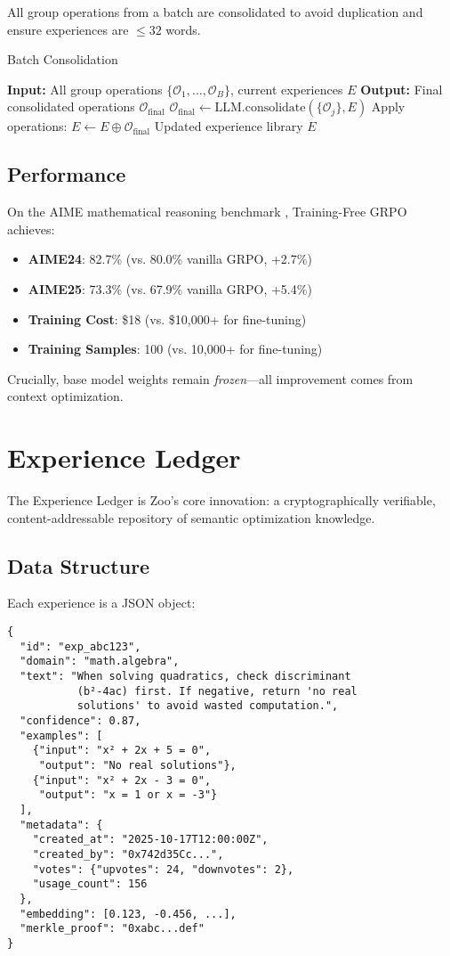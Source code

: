 \documentclass[11pt,a4paper]{article}
\begin{document}
All group operations from a batch are consolidated to avoid duplication and ensure experiences are $\leq 32$ words.

\begin{algorithm}[H]
\caption{Batch Consolidation}
\begin{algorithmic}[1]
\STATE \textbf{Input:} All group operations $\{\mathcal{O}_1, \ldots, \mathcal{O}_B\}$, current experiences $E$
\STATE \textbf{Output:} Final consolidated operations $\mathcal{O}_{\text{final}}$
\STATE $\mathcal{O}_{\text{final}} \leftarrow \text{LLM.consolidate}(\{\mathcal{O}_j\}, E)$
\STATE Apply operations: $E \leftarrow E \oplus \mathcal{O}_{\text{final}}$
\RETURN Updated experience library $E$
\end{algorithmic}
\end{algorithm}

\subsection{Performance}

On the AIME mathematical reasoning benchmark \cite{hendrycks2021math}, Training-Free GRPO achieves:
\begin{itemize}
\item \textbf{AIME24}: 82.7\% (vs. 80.0\% vanilla GRPO, +2.7\%)
\item \textbf{AIME25}: 73.3\% (vs. 67.9\% vanilla GRPO, +5.4\%)
\item \textbf{Training Cost}: \$18 (vs. \$10,000+ for fine-tuning)
\item \textbf{Training Samples}: 100 (vs. 10,000+ for fine-tuning)
\end{itemize}

Crucially, base model weights remain \textit{frozen}—all improvement comes from context optimization.

\section{Experience Ledger}

The Experience Ledger is Zoo's core innovation: a cryptographically verifiable, content-addressable repository of semantic optimization knowledge.

\subsection{Data Structure}

Each experience is a JSON object:
\begin{verbatim}
{
  "id": "exp_abc123",
  "domain": "math.algebra",
  "text": "When solving quadratics, check discriminant
           (b²-4ac) first. If negative, return 'no real
           solutions' to avoid wasted computation.",
  "confidence": 0.87,
  "examples": [
    {"input": "x² + 2x + 5 = 0",
     "output": "No real solutions"},
    {"input": "x² + 2x - 3 = 0",
     "output": "x = 1 or x = -3"}
  ],
  "metadata": {
    "created_at": "2025-10-17T12:00:00Z",
    "created_by": "0x742d35Cc...",
    "votes": {"upvotes": 24, "downvotes": 2},
    "usage_count": 156
  },
  "embedding": [0.123, -0.456, ...],
  "merkle_proof": "0xabc...def"
}
\end{verbatim}
\end{document}
